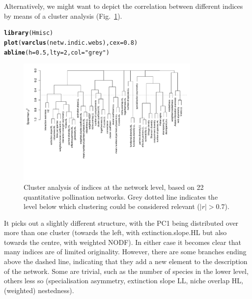 \documentclass[a4paper, 11pt]{article}\usepackage[]{graphicx}\usepackage[dvipsnames]{xcolor}
\makeatletter
\newcommand{\hlnum}[1]{\textcolor[rgb]{0.686,0.059,0.569}{#1}}%
\newcommand{\hlstr}[1]{\textcolor[rgb]{0.192,0.494,0.8}{#1}}%
\newcommand{\hlstd}[1]{\textcolor[rgb]{0.345,0.345,0.345}{#1}}%
\newcommand{\hlkwc}[1]{\textcolor[rgb]{0.333,0.667,0.333}{#1}}%
\newcommand{\hlkwd}[1]{\textcolor[rgb]{0.737,0.353,0.396}{\textbf{#1}}}%
\newenvironment{kframe}{%
 \def\at@end@of@kframe{}%
 \ifinner\ifhmode%
  \def\at@end@of@kframe{\end{minipage}}%
  \begin{minipage}{\columnwidth}%
 \fi\fi%
 \def\FrameCommand##1{\hskip\@totalleftmargin \hskip-\fboxsep
 \colorbox{shadecolor}{##1}\hskip-\fboxsep
     \hskip-\linewidth \hskip-\@totalleftmargin \hskip\columnwidth}%
 \MakeFramed {\advance\hsize-\width
   \@totalleftmargin\z@ \linewidth\hsize
   \@setminipage}}%
 {\par\unskip\endMakeFramed%
 \at@end@of@kframe}
\newenvironment{knitrout}{}{} %
\makeatother
\begin{document}
Alternatively, we might want to depict the correlation between different indices by means of a cluster analysis (Fig.~\ref{fig:clusternetworklevel}).
\begin{knitrout}
\color{fgcolor}\begin{kframe}
\begin{alltt}
\hlkwd{library}\hlstd{(Hmisc)}
\hlkwd{plot}\hlstd{(}\hlkwd{varclus}\hlstd{(netw.indic.webs),} \hlkwc{cex}\hlstd{=}\hlnum{0.8}\hlstd{)}
\hlkwd{abline}\hlstd{(}\hlkwc{h}\hlstd{=}\hlnum{0.5}\hlstd{,} \hlkwc{lty}\hlstd{=}\hlnum{2}\hlstd{,} \hlkwc{col}\hlstd{=}\hlstr{"grey"}\hlstd{)}
\end{alltt}
\end{kframe}
\end{knitrout}
\begin{figure}
\centering
\includegraphics[width=0.8\textwidth]{figures/clusternetworklevel}
\caption{Cluster analysis of indices at the network level, based on 22 quantitative pollination networks. Grey dotted line indicates the level below which clustering could be considered relevant ($|r| > 0.7$).}
\label{fig:clusternetworklevel}
\end{figure}
%
It picks out a slightly different structure, with the PC1 being distributed over more than one cluster (towards the left, with extinction.slope.HL but also towards the centre, with weighted NODF). In either case it becomes clear that many indices are of limited originality. However, there are some branches ending above the dashed line, indicating that they add a new element to the description of the network. Some are trivial, such as the number of species in the lower level, others less so (specialisation asymmetry, extinction slope LL, niche overlap HL, (weighted) nestedness). 
\end{document}
